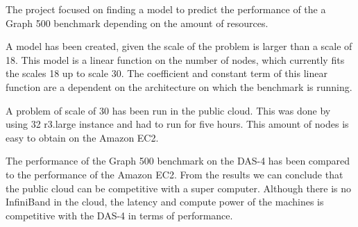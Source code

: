 The project focused on finding a model to predict the performance of the a Graph 500 benchmark depending on the amount of resources.

A model has been created, given the scale of the problem is larger than a scale of 18. This model is a linear function on the number of nodes, which currently fits the scales 18 up to scale 30. The coefficient and constant term of this linear function are a dependent on the architecture on which the benchmark is running.

A problem of scale of 30 has been run in the public cloud. This was done by using 32 r3.large instance and had to run for five hours. This amount of nodes is easy to obtain on the Amazon EC2.  

The performance of the Graph 500 benchmark on the DAS-4 has been compared to the performance of the Amazon EC2. From the results we can conclude that the public cloud can be competitive with a super computer. Although there is no InfiniBand in the cloud, the latency and compute power of the machines is competitive with the DAS-4 in terms of performance.
 

